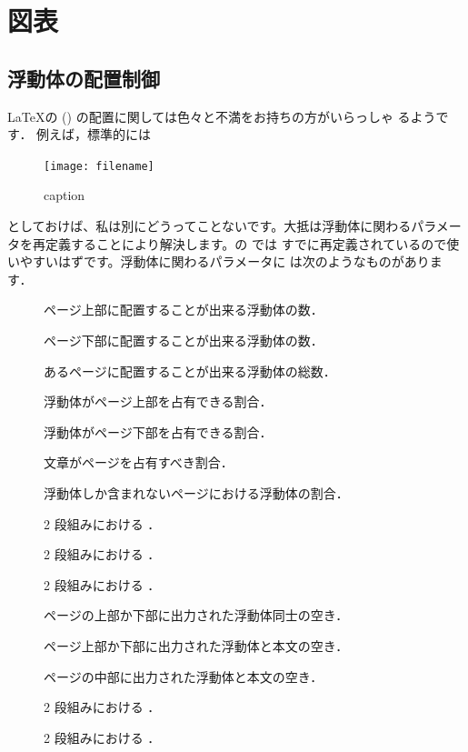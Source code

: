 ﻿\chapter{図表}


\section{浮動体の配置制御\texorpdfstring{\zdash}{---}}
%
%

\LaTeX の () の配置に関しては色々と不満をお持ちの方がいらっしゃ
るようです．%
例えば，標準的には
\begin{inputex}
\begin{figure}[htbp]
 \begin{center}
    \texttt{[image: filename]}
    \caption{caption\label{fig:label}}
 \end{center}
\end{figure}
\end{inputex}
としておけば、私は別にどうってことないです。大抵は浮動体に関わるパラメー
タを再定義することにより解決します。の  では
すでに再定義されているので使いやすいはずです。浮動体に関わるパラメータに
は次のようなものがあります．
\begin{description}
\item[] 
ページ上部に配置することが出来る浮動体の数．
\item[]
ページ下部に配置することが出来る浮動体の数．
\item[]
あるページに配置することが出来る浮動体の総数．
\item[]
浮動体がページ上部を占有できる割合．
\item[]
浮動体がページ下部を占有できる割合．
\item[]
文章がページを占有すべき割合．
\item[]
浮動体しか含まれないページにおける浮動体の割合．
\item[]
2 段組みにおける ．
\item[]
2 段組みにおける ．
\item[]
2 段組みにおける ．
\item[]
ページの上部か下部に出力された浮動体同士の空き．
\item[]
ページ上部か下部に出力された浮動体と本文の空き．
\item[]
ページの中部に出力された浮動体と本文の空き．
\item[]
2 段組みにおける ．
\item[]
2 段組みにおける ．
\end{description}
